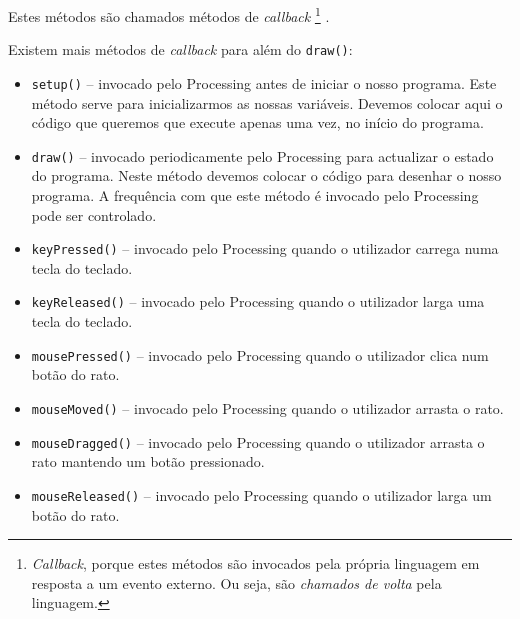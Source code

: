 Estes métodos são chamados métodos de \emph{callback}%
\footnote{\emph{Callback}, porque estes métodos são invocados pela própria linguagem em resposta a um evento externo. Ou seja, são \emph{chamados de volta} pela linguagem.}%
.
 
Existem mais métodos de \emph{callback} para além do \texttt{draw()}:
\begin{itemize}
\item \texttt{setup()} -- invocado pelo Processing antes de iniciar o nosso programa. Este método serve para inicializarmos as nossas variáveis. Devemos colocar aqui o código que queremos que execute apenas uma vez, no início do programa.

\item \texttt{draw()} -- invocado periodicamente pelo Processing para actualizar o estado do programa. Neste método devemos colocar o código para desenhar o nosso programa. A frequência com que este método é invocado pelo Processing pode ser controlado.

\item \texttt{keyPressed()} -- invocado pelo Processing quando o utilizador carrega numa tecla do teclado. 

\item \texttt{keyReleased()} -- invocado pelo Processing quando o utilizador larga uma tecla do teclado. 

\item \texttt{mousePressed()} -- invocado pelo Processing quando o utilizador clica num botão do rato.

\item \texttt{mouseMoved()} -- invocado pelo Processing quando o utilizador arrasta o rato.

\item \texttt{mouseDragged()} -- invocado pelo Processing quando o utilizador arrasta o rato mantendo um botão pressionado.

\item \texttt{mouseReleased()} --	invocado pelo Processing quando o utilizador larga um botão do rato.
\end{itemize}

